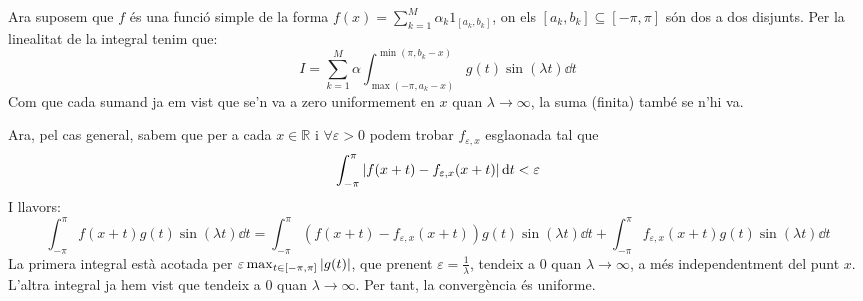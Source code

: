 \documentclass[10pt,a4paper]{article}
\newcommand{\RR}{\ensuremath{\mathbb{R}}} %
\newcommand{\vf}[1]{\boldsymbol{\mathrm{#1}}} %
\theoremstyle{definition}
\begin{document}
\begin{enumerate}
        Ara suposem que $f$ és una funció simple de la forma $f(x)=\sum_{k=1}^M\alpha_k\vf{1}_{[a_k,b_k]}$, on els $[a_k,b_k]\subseteq[-\pi,\pi]$ són dos a dos disjunts. Per la linealitat de la integral tenim que:
        \begin{equation*}
          I=\sum_{k=1}^M\alpha\int_{\max(-\pi,a_k-x)}^{\min(\pi,b_k-x)}g(t)\sin(\lambda t)\dd{t}
        \end{equation*}
        Com que cada sumand ja em vist que se'n va a zero uniformement en $x$ quan $\lambda\to\infty$, la suma (finita) també se n'hi va.

        Ara, pel cas general, sabem que per a cada $x\in\RR$ i $\forall \varepsilon >0$ podem trobar $f_{\varepsilon, x}$ esglaonada tal que $$\int_{-\pi}^{\pi}\abs{f(x+t)-f_{\varepsilon,x}(x+t)}\dd{t}<\varepsilon$$ I llavors:
        $$\int_{-\pi}^{\pi}f(x+t)g(t)\sin(\lambda t)\dd{t} = \int_{-\pi}^{\pi}(f(x+t)-f_{\varepsilon,x}(x+t))g(t)\sin(\lambda t)\dd{t}+\int_{-\pi}^{\pi}f_{\varepsilon,x}(x+t)g(t)\sin(\lambda t)\dd{t}$$
        La primera integral està acotada per $\varepsilon \max_{t\in[-\pi,\pi]}\abs{g(t)}$, que prenent $\varepsilon=\frac{1}{\lambda}$, tendeix a 0 quan $\lambda\to\infty$, a més independentment del punt $x$. L'altra integral ja hem vist que tendeix a 0 quan $\lambda\to\infty$. Per tant, la convergència és uniforme.


\end{enumerate}
\end{document}
